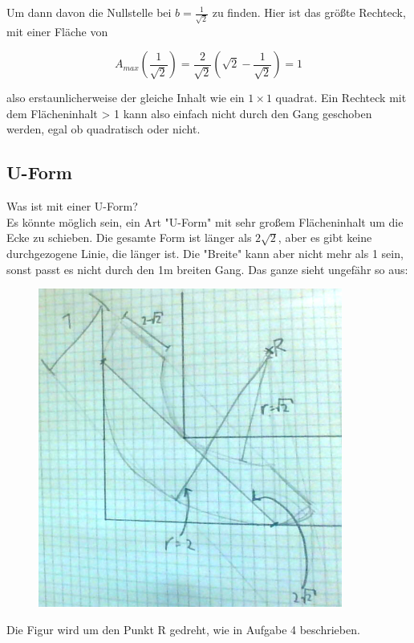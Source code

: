 \documentclass[a4paper,11pt]{article}
\begin{document}
Um dann davon die Nullstelle bei $b = \frac{1}{\sqrt{2}}$ zu finden. Hier ist das größte Rechteck, mit einer Fläche von

\[ A_{max}(\frac{1}{\sqrt{2}}) = \frac{2}{\sqrt{2}}(\sqrt{2} - \frac{1}{\sqrt{2}}) = 1 \]

also erstaunlicherweise der gleiche Inhalt wie ein $1\times 1$ quadrat. Ein Rechteck mit dem Flächeninhalt > 1 kann also einfach nicht durch den Gang geschoben werden, egal ob quadratisch oder nicht.

\subsection{U-Form}

Was ist mit einer U-Form?\\
Es könnte möglich sein, ein Art "U-Form" mit sehr großem Flächeninhalt um die Ecke zu schieben. Die gesamte Form ist länger als $2\sqrt{2}$, aber es gibt keine durchgezogene Linie, die länger ist. Die "Breite" kann aber nicht mehr als 1 sein, sonst passt es nicht durch den 1m breiten Gang. Das ganze sieht ungefähr so aus:
\begin{figure}[H] 
        \centering
        \includegraphics[width=10cm]{img/FA_2.jpg}
\end{figure}
Die Figur wird um den Punkt R gedreht, wie in Aufgabe 4 beschrieben.
\end{document}

